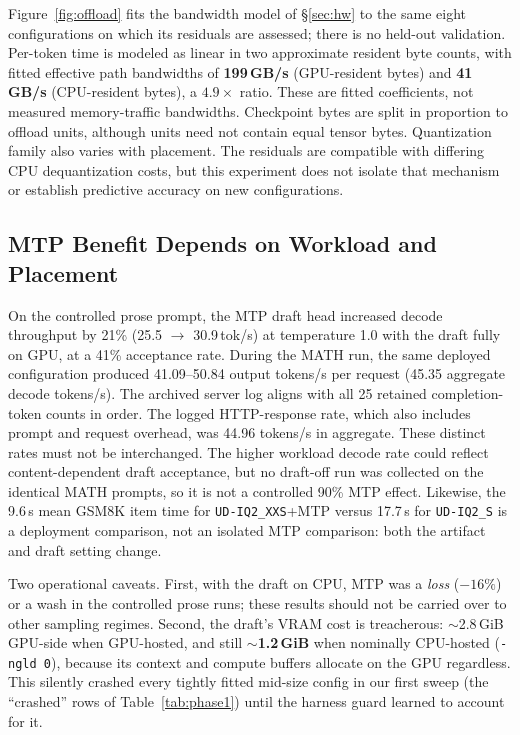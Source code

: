 \documentclass[11pt]{article}
\newcommand{\q}[1]{\texttt{#1}}
\begin{document}
Figure~\ref{fig:offload} fits the bandwidth model of \S\ref{sec:hw} to
the same eight configurations on which its residuals are assessed; there is
no held-out validation. Per-token time is modeled as linear in two approximate
resident byte counts, with
fitted effective path bandwidths of \textbf{199\,GB/s} (GPU-resident bytes)
and \textbf{41\,GB/s} (CPU-resident bytes), a $4.9\times$ ratio.
These are fitted coefficients, not measured memory-traffic bandwidths.
Checkpoint bytes are split in proportion to offload units, although units
need not contain equal tensor bytes. Quantization family also varies with
placement. The residuals are compatible with differing CPU dequantization
costs, but this experiment does not isolate that mechanism or establish
predictive accuracy on new configurations.


\subsection{MTP Benefit Depends on Workload and Placement}
\label{sec:mtp}

On the controlled prose prompt, the MTP draft head increased decode throughput by
21\% (25.5 $\rightarrow$ 30.9\,tok/s) at temperature 1.0 with the draft fully
on GPU, at a 41\% acceptance rate. During the MATH run, the same deployed
configuration produced 41.09--50.84 output tokens/s per request (45.35 aggregate
decode tokens/s). The archived server log aligns with all 25 retained
completion-token counts in order. The logged HTTP-response rate, which also
includes prompt and request overhead, was 44.96 tokens/s in aggregate.
These distinct rates must not be interchanged. The higher workload decode
rate could reflect content-dependent draft acceptance, but no draft-off run was
collected on the identical MATH prompts, so it is not a controlled 90\% MTP
effect. Likewise, the 9.6\,s mean GSM8K item time for
\q{UD-IQ2\_XXS}+MTP versus 17.7\,s for \q{UD-IQ2\_S} is a deployment
comparison, not an isolated MTP comparison: both the artifact and draft setting
change.

Two operational caveats. First, with the draft on CPU, MTP was a \emph{loss}
($-16\%$) or a wash in the controlled prose runs; these results should not be carried
over to other sampling regimes. Second, the draft's
VRAM cost is treacherous: $\sim$2.8\,GiB GPU-side when GPU-hosted, and still
$\sim$\textbf{1.2\,GiB} when nominally CPU-hosted (\q{-ngld 0}), because its
context and compute buffers allocate on the GPU regardless. This silently
crashed every tightly fitted mid-size config in our first sweep (the
``crashed'' rows of Table~\ref{tab:phase1}) until the harness guard learned to
account for it.
\end{document}
